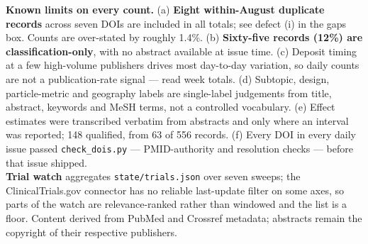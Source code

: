 \documentclass[10pt]{article}
\begin{document}
\begin{keybox}
{\textbf{Known limits on every count.} (a) \textbf{Eight within-August duplicate records}
across seven DOIs are included in all totals; see defect (i) in the gaps box. Counts are
over-stated by roughly 1.4\%. (b) \textbf{Sixty-five records (12\%) are
classification-only}, with no abstract available at issue time. (c) Deposit timing at a
few high-volume publishers drives most day-to-day variation, so daily counts are not a
publication-rate signal --- read week totals. (d) Subtopic, design, particle-metric and
geography labels are single-label judgements from title, abstract, keywords and MeSH
terms, not a controlled vocabulary. (e) Effect estimates were transcribed verbatim from
abstracts and only where an interval was reported; 148 qualified, from 63 of 556 records.
(f) Every DOI in every daily issue passed \texttt{check\_dois.py} --- PMID-authority and
resolution checks --- before that issue shipped.
\\[1.0mm]
\textbf{Trial watch} aggregates \texttt{state/trials.json} over seven sweeps; the
ClinicalTrials.gov connector has no reliable last-update filter on some axes, so parts of
the watch are relevance-ranked rather than windowed and the list is a floor.
Content derived from PubMed and Crossref metadata; abstracts remain the copyright of
their respective publishers.\par}
\end{keybox}
\end{document}
